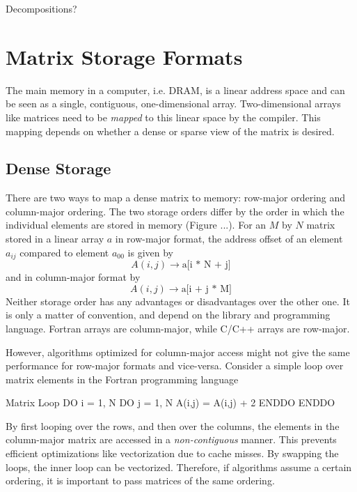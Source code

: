 Decompositions?

\section{Matrix Storage Formats}

The main memory in a computer, i.e. DRAM, is a linear address space and can be seen as a single, contiguous, one-dimensional array. Two-dimensional arrays like matrices need to be \emph{mapped} to this linear space by the compiler. This mapping depends on whether a dense or sparse view of the matrix is desired. 

\subsection{Dense Storage}

There are two ways to map a dense matrix to memory: row-major ordering and column-major ordering. The two storage orders differ by the order in which the individual elements are stored in memory (Figure ...). For an $M$ by $N$ matrix stored in a linear array $a$ in row-major format, the address offset of an element $a_{ij}$ compared to element $a_{00}$ is given by
\begin{equation}
A(i,j) \rightarrow \text{a[i * N + j]}
\end{equation}
\noindent and in column-major format by
\begin{equation}
A(i,j) \rightarrow \text{a[i + j * M]}
\end{equation}
Neither storage order has any advantages or disadvantages over the other one. It is only a matter of convention, and depend on the library and programming language. Fortran arrays are column-major, while C/C++ arrays are row-major. 

However, algorithms optimized for column-major access might not give the same performance for row-major formats and vice-versa. Consider a simple loop over matrix elements in the Fortran programming language
\begin{fortran}{Matrix Loop \label{FORTRAN1}}
DO i = 1, N
 DO j = 1, N
  A(i,j) = A(i,j) + 2
 ENDDO
ENDDO
\end{fortran}
\noindent By first looping over the rows, and then over the columns, the elements in the column-major matrix are accessed in a \emph{non-contiguous} manner. This prevents efficient optimizations like vectorization due to cache misses. By swapping the loops, the inner loop can be vectorized. Therefore, if algorithms assume a certain ordering, it is important to pass matrices of the same ordering.

